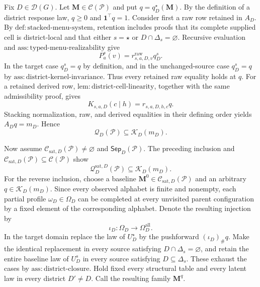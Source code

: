 Fix \(D\in\mathcal D(G)\).  Let \(\mathbf M\in\mathcal C(\mathcal P)\) and put \(q=q_D^\star(\mathbf M)\).  By the definition of a district response law, \(q\geq0\) and \(\mathbf 1^\top q=1\).  Consider first a raw row retained in \(A_D\).  By \(\mathrm{def:stacked\text{-}menu\text{-}system}\), retention includes proofs that its complete supplied cell is district-local and that either \(s=\star\) or \(D\cap\Delta_s=\varnothing\).  Recursive evaluation and \(\mathrm{ass:typed\text{-}menu\text{-}realizability}\) give
\[
P_a^s(v)=r^{\mathrm{raw}}_{s,a,D,v}q_D^s.
\]
In the target case \(q_D^s=q\) by definition, and in the unchanged-source case \(q_D^s=q\) by \(\mathrm{ass:district\text{-}kernel\text{-}invariance}\).  Thus every retained raw equality holds at \(q\).  For a retained derived row, \(\mathrm{lem:district\text{-}cell\text{-}linearity}\), together with the same admissibility proof, gives
\[
K_{s,a,D}(c\mid h)=r_{s,a,D,h,c}q.
\]
Stacking normalization, raw, and derived equalities in their defining order yields \(A_Dq=m_D\).  Hence
\[
\mathcal Q_D(\mathcal P)\subseteq\mathcal K_D(m_D).
\]

Now assume \(\mathcal C_{\mathrm{sat},D}(\mathcal P)\ne\varnothing\) and \(\mathsf{Sep}_D(\mathcal P)\).  The preceding inclusion and \(\mathcal C_{\mathrm{sat},D}(\mathcal P)\subseteq\mathcal C(\mathcal P)\) show
\[
\mathcal Q_D^{\mathrm{sat},D}(\mathcal P)\subseteq\mathcal K_D(m_D).
\]
For the reverse inclusion, choose a baseline \(\mathbf M^0\in\mathcal C_{\mathrm{sat},D}(\mathcal P)\) and an arbitrary \(q\in\mathcal K_D(m_D)\).  Since every observed alphabet is finite and nonempty, each partial profile \(\omega_D\in\Omega_D\) can be completed at every unvisited parent configuration by a fixed element of the corresponding alphabet.  Denote the resulting injection by
\[
\iota_D:\Omega_D\longrightarrow\Omega_D^{\mathrm{all}}.
\]
In the target domain replace the law of \(U_D^\star\) by the pushforward \((\iota_D)_\#q\).  Make the identical replacement in every source satisfying \(D\cap\Delta_s=\varnothing\), and retain the entire baseline law of \(U_D^s\) in every source satisfying \(D\subseteq\Delta_s\).  These exhaust the cases by \(\mathrm{ass:district\text{-}closure}\).  Hold fixed every structural table and every latent law in every district \(D'\ne D\).  Call the resulting family \(\mathbf M^q\).

